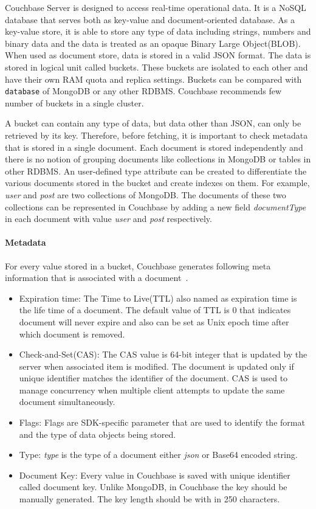  Couchbase Server is designed to access real-time operational data. It is a NoSQL database that serves both as key-value and document-oriented database. As a key-value store, it is able to store any type of data including  strings, numbers and binary data and the data is treated as an opaque Binary Large Object(BLOB). When used as document store, data is stored in a valid JSON format. The data is stored in logical unit called buckets. These buckets are isolated to each other and have their own RAM quota and replica settings. Buckets can be compared with \texttt{database} of MongoDB or any other RDBMS. Couchbase recommends few number of buckets in a single cluster. 
 
 A bucket can contain any type of data, but data other than JSON, can only be retrieved by its key. Therefore, before fetching, it is important to check metadata that is stored in a single document. Each document is stored independently and there is no notion of grouping documents like collections in MongoDB or tables in other RDBMS. An user-defined type attribute can be created to differentiate the various documents stored in the bucket and  create indexes on them.  For example, \textit{user} and \textit{post} are two collections of MongoDB. The documents of these two collections can be represented in Couchbase by adding a new field \textit{documentType}  in each document with value \textit{user} and \textit{post} respectively.  

\paragraph{Metadata}\label{cb-metadata}
For every value stored in a bucket, Couchbase generates following meta information that is associated with a document~\cite[p. 26]{cb/ostrovsky2014pro}. 
\begin{itemize}
	\item{Expiration time:}
		The Time to Live(TTL) also named as expiration time is the life time of a document. The default value of TTL is 0 that indicates document will never expire and also can be set as Unix epoch time after which document is removed.
	\item{Check-and-Set(CAS):}
		The CAS value is 64-bit integer that is updated by the server when associated item is modified. The document is updated only  if unique identifier matches the identifier of the document. CAS is used to manage concurrency when multiple client attempts to update the same document simultaneously. 
	\item{Flags:} 
Flags are SDK-specific parameter that are used to identify the format and the type of data objects being stored.
\item{Type:}
 \textit{type} is the type of a document either \textit{json} or Base64 encoded string.
 \item{Document Key:}
 Every value in Couchbase is saved with unique identifier called document key. Unlike MongoDB, in Couchbase the key should be manually generated. The key length should be with in 250 characters.
\end{itemize}	

